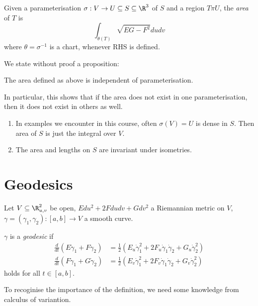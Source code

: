 \documentclass[a4paper]{article}
\theoremstyle{definition}
\begin{document}
\begin{definition}[Area]
  Given a parameterisation \(\sigma: V \to U \subseteq S \subseteq \R^3\) of \(S\) and a region \(T \pi U\), the \emph{area} of \(T\) is
  \[
    \int_{\theta(T)} \sqrt{EG - F^2} dudv
  \]
  where \(\theta = \sigma^{-1}\) is a chart, whenever RHS is defined.
\end{definition}

We state without proof a proposition:

\begin{proposition}
  The area defined as above is independent of parameterisation.
\end{proposition}
In particular, this shows that if the area does not exist in one parameterisation, then it does not exist in others as well.

\begin{remark}\leavevmode
  \begin{enumerate}
  \item In examples we encounter in this course, often \(\sigma(V) = U\) is dense in \(S\). Then area of \(S\) is just the integral over \(V\).
  \item The area and lengths on \(S\) are invariant under isometries.
  \end{enumerate}
\end{remark}

\section{Geodesics}

Let \(V \subseteq \R^2_{u, v}\) be open, \(Edu^2 + 2Fdudv + Gdv^2\) a Riemannian metric on \(V\), \(\gamma = (\gamma_1, \gamma_2): [a, b] \to V\) a smooth curve.

\begin{definition}[Geodesic]
  \(\gamma\) is a \emph{geodesic} if
  \begin{align*}
    \frac{d}{dt} (E \dot \gamma_1 + F \dot \gamma_2) &= \frac{1}{2} (E_u \dot \gamma_1^2 + 2F_u \dot \gamma_1 \dot \gamma_2 + G_u \dot \gamma_2^2) \\
    \frac{d}{dt} (F \dot \gamma_1 + G \dot \gamma_2) &= \frac{1}{2} (E_v \dot \gamma_1^2 + 2F_v \dot \gamma_1 \dot \gamma_2 + G_v \dot \gamma_2^2)
  \end{align*}
  holds for all \(t \in [a, b]\).
\end{definition}

To recoginise the importance of the definition, we need some knowledge from calculus of variantion.
\end{document}
